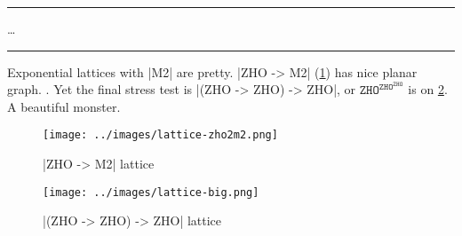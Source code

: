 \documentclass{article}
\begin{document}
\rule{\textwidth}{1pt}
\ldots
\rule{\textwidth}{1pt}

Exponential lattices with |M2| are pretty. |ZHO -> M2| (\cref{fig:zho2m2})
has nice planar graph. \ldtos . Yet the final stress test is
|(ZHO -> ZHO) -> ZHO|, or $\mathtt{ZHO}^{\mathtt{ZHO}^\mathtt{ZHO}}$ is on \cref{fig:big}.
A beautiful monster.

\begin{figure}[ht]
\begin{center}
\texttt{[image: ../images/lattice-zho2m2.png]}
\end{center}
\caption{|ZHO -> M2| lattice}
\label{fig:zho2m2}
\end{figure}

\begin{figure}[ht]
\begin{center}
\texttt{[image: ../images/lattice-big.png]}
\end{center}
\caption{|(ZHO -> ZHO) -> ZHO| lattice}
\label{fig:big}
\end{figure}
\end{document}
